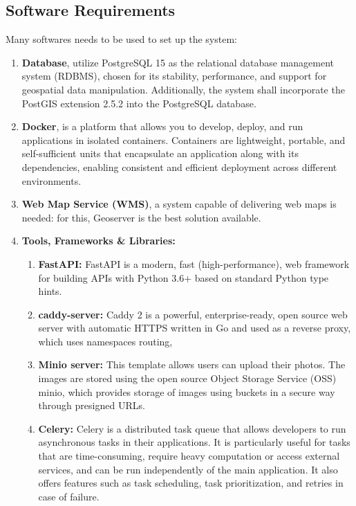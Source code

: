 \newpage

\subsection{Software Requirements}\label{subsec:software-requirements}
Many softwares needs to be used to set up the system:
\begin{enumerate}
    \item \textbf{Database}, utilize PostgreSQL 15 as the relational database management system (RDBMS), chosen for its stability, performance, and support for geospatial data manipulation. Additionally, the system shall incorporate the PostGIS extension 2.5.2 into the PostgreSQL database.

    \item \textbf{Docker}, is a platform that allows you to develop, deploy, and run applications in isolated containers. Containers are lightweight, portable, and self-sufficient units that encapsulate an application along with its dependencies, enabling consistent and efficient deployment across different environments.
    
    \item \textbf{Web Map Service (WMS)}, a system capable of delivering web maps is needed: for this, Geoserver is the best solution available.
    
    \item \textbf{Tools, Frameworks \& Libraries:}
    \begin{enumerate}
        \item \textbf{FastAPI:} FastAPI is a modern, fast (high-performance), web framework for building APIs with Python 3.6+ based on standard Python type hints.

        \item \textbf{caddy-server:} Caddy 2 is a powerful, enterprise-ready, open source web server with automatic HTTPS written in Go and used as a reverse proxy, which uses namespaces routing,
        
        \item \textbf{Minio server:} This template allows users can upload their photos. The images are stored using the open source Object Storage Service (OSS) minio, which provides storage of images using buckets in a secure way through presigned URLs.
    
        \item \textbf{Celery:} Celery is a distributed task queue that allows developers to run asynchronous tasks in their applications. It is particularly useful for tasks that are time-consuming, require heavy computation or access external services, and can be run independently of the main application. It also offers features such as task scheduling, task prioritization, and retries in case of failure.


\end{enumerate}
\end{enumerate}
